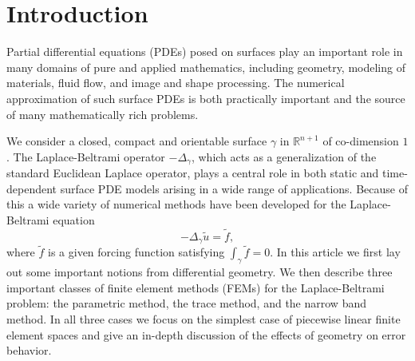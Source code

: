 
\section{Introduction}\label{sec:introduction}

Partial differential equations (PDEs) posed on surfaces play an important role in many domains of pure and applied mathematics, including geometry, modeling of materials, fluid flow, and image and shape processing.  The numerical approximation of such surface PDEs is both practically important and the source of many mathematically rich problems.  

We consider a closed, compact and orientable surface $\gamma$ in $\mathbb{R}^{n+1}$ of co-dimension $1$.  The Laplace-Beltrami operator $-\Delta_\gamma$, which acts as a generalization of the standard Euclidean Laplace operator, plays a central role in both static and time-dependent surface PDE models arising in a wide range of applications.  Because of this a wide variety of numerical methods have been developed for the Laplace-Beltrami equation %
\[
-\Delta_\gamma \widetilde u=\widetilde f,
\]
%
where $\widetilde f$ is a given forcing function satisfying $\int_\gamma \widetilde f =0$.  In this article we first lay out some important notions from differential geometry.  We then describe three important classes of finite element methods (FEMs) for the Laplace-Beltrami problem:  the parametric method, the trace method, and the narrow band method.   In all three cases we focus on the simplest case of piecewise linear finite element spaces and give an in-depth discussion of the effects of geometry on error behavior.  


